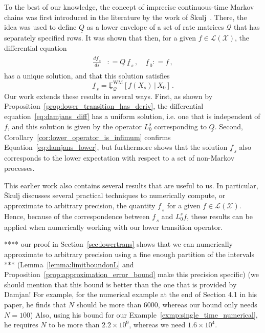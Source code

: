 \documentclass[10pt,a4paper]{paper}
\theoremstyle{definition}
\newcommand{\states}{\mathcal{X}}
\newcommand{\gambles}{\mathcal{L}}
\newcommand{\gamblesX}{\gambles(\states)}
\newcommand{\rateset}{\mathcal{Q}}
\newcommand{\lrate}{\underline{Q}}
\newcommand{\coloneqq}{:\!=}
\begin{document}
To the best of our knowledge, the concept of imprecise continuous-time Markov chains was first introduced in the literature by the work of {\v{S}}kulj~\cite{Skulj:2015cq}. There, the idea was used to define $\lrate$ as a lower envelope of a set of rate matrices $\rateset$ that has separately specified rows. It was shown that then, for a given $f\in\gamblesX$, the differential equation
\begin{align}\label{eq:damjans_diff}
\begin{split}
\frac{d \underline{f}_{\,s}}{d s} &\coloneqq \lrate\,\underline{f}_{\,s}\,,\quad
\underline{f}_{\,0} \coloneqq f\,,
\end{split}
\end{align}
has a unique solution, and that this solution satisfies
\begin{equation}\label{eq:damjans_lower}
\underline{f}_{\,s} = \underline{\mathbb{E}}_{\rateset}^{\mathrm{WM}}[f(X_s)\,\vert\,X_0]\,.
\end{equation}
Our work extends these results in several ways. First, as shown by Proposition~\ref{prop:lower_transition_has_deriv}, the differential equation~\eqref{eq:damjans_diff} has a uniform solution, i.e. one that is independent of $f$, and this solution is given by the operator $L_0^s$ corresponding to $\lrate$. Second, Corollary~\ref{cor:lower_operator_is_infimum} confirms Equation~\eqref{eq:damjans_lower}, but furthermore shows that the solution $\underline{f}_{\,s}$ also corresponds to the lower expectation with respect to a set of non-Markov processes.

This earlier work also contains several results that are useful to us. In particular, {\v{S}}kulj discusses several practical techniques to numerically compute, or approximate to arbitrary precision, the quantity $\underline{f}_{\,s}$ for a given $f\in\gamblesX$. Hence, because of the correspondence between $\underline{f}_{\,s}$ and $L_0^sf$, these results can be applied when numerically working with our lower transition operator.

**** our proof in Section~\ref{sec:lowertrans} shows that we can numerically approximate to arbitrary precision using a fine enough partition of the intervals *** (Lemma~\ref{lemma:limitboundonL} and Proposition~\ref{prop:approximation_error_bound} make this precision specific) (we should mention that this bound is better than the one that is provided by Damjan! For example, for the numerical example at the end of Section 4.1 in his paper, he finds that $N$ should be more than $6000$, whereas our bound only needs $N=100$) Also, using his bound for our Example~\ref{exmp:single_time_numerical}, he requires $N$ to be more than $2.2\times 10^9$, whereas we need $1.6\times 10^4$.
\end{document}
